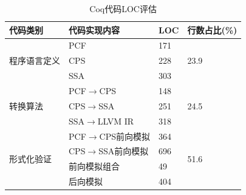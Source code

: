 \begin{table}
    \linespread{1.25}
    \small
    \centering
    \caption{Coq代码LOC评估}\label{tabeval}
    \begin{center}
    \begin{tabular}{|l|l|l|l|}
    \hline
    代码类别 & 代码实现内容 & LOC & 行数占比(\%) \\
    \hline
    \multirow{3}{*}{程序语言定义} & PCF & 171 & \multirow{3}{*}{23.9} \\
        & CPS & 228 & \\
        & SSA & 303 & \\
        \hline
    \multirow{3}{*}{转换算法} & PCF$\rightarrow$CPS & 148 & \multirow{3}{*}{24.5} \\
        & CPS$\rightarrow$SSA & 251 & \\
        & SSA$\rightarrow$LLVM IR & 318 & \\
        \hline
    \multirow{4}{*}{形式化验证} & PCF$\rightarrow$CPS前向模拟 & 364 & \multirow{4}{*}{51.6} \\
        & CPS$\rightarrow$SSA前向模拟 & 696 & \\
        & 前向模拟组合 & 49 & \\
        & 后向模拟 & 404 & \\
        \hline
    \end{tabular}
    \end{center}
\end{table}

